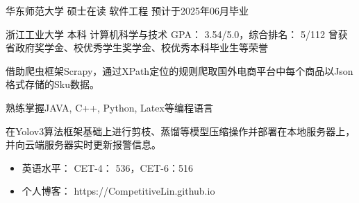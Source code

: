 


	





{华东师范大学}
{硕士在读}
{软件工程}
{预计于2025年06月毕业}

{浙江工业大学}
{本科}
{计算机科学与技术}
{GPA： 3.54/5.0，综合排名： 5/112}
{曾获省政府奖学金、校优秀学生奖学金、校优秀本科毕业生等荣誉}

\vspace*{-0.2cm}

借助爬虫框架Scrapy，通过XPath定位的规则爬取国外电商平台中每个商品以Json格式存储的Sku数据。

熟练掌握JAVA, C++, Python, Latex等编程语言


在Yolov3算法框架基础上进行剪枝、蒸馏等模型压缩操作并部署在本地服务器上，并向云端服务器实时更新报警信息。


\begin{itemize}	
	\item 英语水平： CET-4： 536，CET-6：516
	\item 个人博客： https://CompetitiveLin.github.io
\end{itemize}


